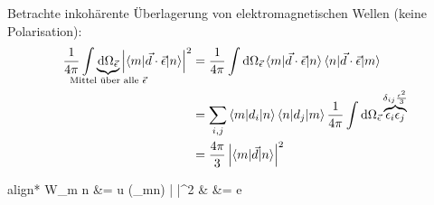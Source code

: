 	Betrachte inkohärente Überlagerung von elektromagnetischen Wellen (keine Polarisation):
		\begin{align*}
			\frac{1}{4 \pi} \int 
			\underbrace{\diff \Omega_{\vec{\epsilon}}}_{\mathclap{\text{Mittel über alle~} \vec{\epsilon}}} 
			\left|\braket{m | \vec{d} \cdot \vec{\epsilon} | n}\right|^2 
			&= \frac{1}{4 \pi} \int \diff \Omega_{\vec{\epsilon}} 
			\braket{m | \vec{d} \cdot \vec{\epsilon} | n} \braket{n | \vec{d} \cdot \vec{\epsilon} | m} \\
			&= \sum_{i,j} \braket{m | d_i | n} \braket{n | d_j | m} 
			\frac{1}{4 \pi} \int \diff \Omega_{\vec{\epsilon}} 
			\overbrace{\epsilon_i \epsilon_j}^{\mathclap{\delta_{ij}\frac{\epsilon^2}{3}}} \\
			&= \frac{4 \pi}{3} \left|\braket{m | \vec{d} | n}\right|^2
		\end{align*} 
		\begin{empheq}[box=\boxed]{align*}
			W_{m \leftarrow n} &= 
			 u (\omega_{mn}) 
			\left| \right|^2 
			&  &= e  
		\end{empheq}